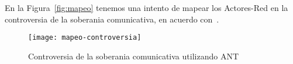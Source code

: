 En la Figura~\vref{fig:mapeo} tenemos una intento de mapear los Actores-Red en la controversia de la soberania comunicativa, en acuerdo con~\autocite{Venturini2010a}.

\begin{sidewaysfigure}
  \centering
  \texttt{[image: mapeo-controversia]}
  \caption[Mapeo]{Controversia de la soberania comunicativa utilizando ANT} %
  \label{fig:mapeo}
\end{sidewaysfigure}




